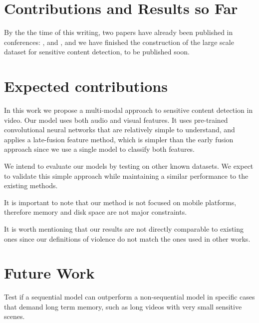 \section{Contributions and Results so Far}
\label{sec:contrib}

By the the time of this writing, two papers have already been published in  conferences: \cite{2019NSFWbaseline}, and \cite{2020PornDetectionSBIE}, and we have finished the construction of the large scale dataset for sensitive content detection, to be published soon.

\section{Expected contributions}
\label{sec:expdcontrib}

In this work we propose a multi-modal approach to sensitive content detection in video. Our model uses both audio and visual features. It uses pre-trained convolutional neural networks that are relatively simple to understand, and  applies a late-fusion feature method, which is simpler than the early fusion approach since we use a single model to classify both features.

We intend to evaluate our models by testing on other known datasets. We expect to validate this simple approach while maintaining a similar performance to the existing methods.

It is important to note that our method is not focused on mobile platforms, therefore memory and disk space are not major constraints. 

It is worth mentioning that our results are not directly comparable to existing ones since our definitions of violence do not match the ones used in other works. 

\section{Future Work}
\label{sec:future}


         
Test if a sequential model can outperform a non-sequential model in specific cases that demand long term memory, such as long videos with very small sensitive scenes.
